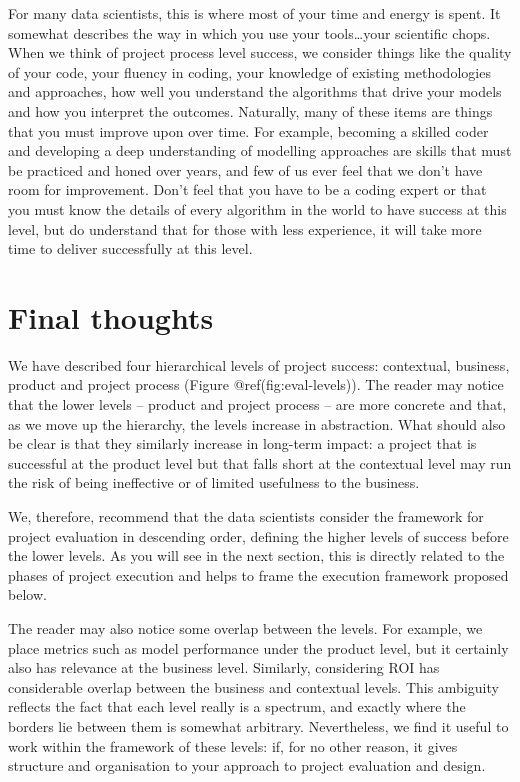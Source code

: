 \documentclass[
]{book}
\begin{document}
For many data scientists, this is where most of your time and energy is
spent. It somewhat describes the way in which you use your
tools\ldots your scientific chops. When we think of project process
level success, we consider things like the quality of your code, your
fluency in coding, your knowledge of existing methodologies and
approaches, how well you understand the algorithms that drive your
models and how you interpret the outcomes. Naturally, many of these
items are things that you must improve upon over time. For example,
becoming a skilled coder and developing a deep understanding of
modelling approaches are skills that must be practiced and honed over
years, and few of us ever feel that we don't have room for improvement.
Don't feel that you have to be a coding expert or that you must know the
details of every algorithm in the world to have success at this level,
but do understand that for those with less experience, it will take more
time to deliver successfully at this level.

\hypertarget{final-thoughts}{%
\section{Final thoughts}\label{final-thoughts}}

We have described four hierarchical levels of project success:
contextual, business, product and project process (Figure
@ref(fig:eval-levels)). The reader may notice that the lower levels --
product and project process -- are more concrete and that, as we move up
the hierarchy, the levels increase in abstraction. What should also be
clear is that they similarly increase in long-term impact: a project
that is successful at the product level but that falls short at the
contextual level may run the risk of being ineffective or of limited
usefulness to the business.

We, therefore, recommend that the data scientists consider the framework
for project evaluation in descending order, defining the higher levels
of success before the lower levels. As you will see in the next section,
this is directly related to the phases of project execution and helps to
frame the execution framework proposed below.

The reader may also notice some overlap between the levels. For example,
we place metrics such as model performance under the product level, but
it certainly also has relevance at the business level. Similarly,
considering ROI has considerable overlap between the business and
contextual levels. This ambiguity reflects the fact that each level
really is a spectrum, and exactly where the borders lie between them is
somewhat arbitrary. Nevertheless, we find it useful to work within the
framework of these levels: if, for no other reason, it gives structure
and organisation to your approach to project evaluation and design.
\end{document}
